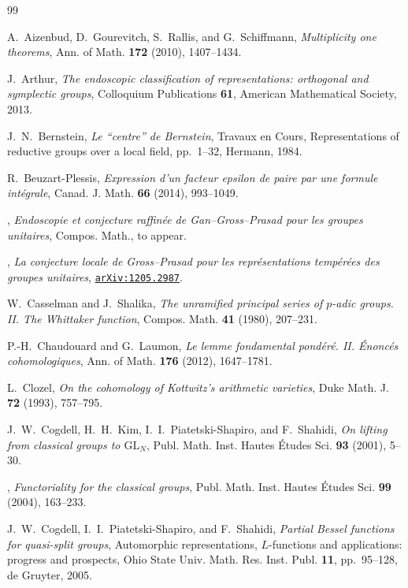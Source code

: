 \documentclass[11pt]{amsart}
\numberwithin{equation}{section}
\theoremstyle{plain}
\theoremstyle{definition}
\theoremstyle{remark}
\begin{document}
\begin{thebibliography}{99}

A.~Aizenbud, D.~Gourevitch, S.~Rallis, and G.~Schiffmann,
\emph{Multiplicity one theorems},
Ann. of Math. \textbf{172} (2010), 1407--1434.

J.~Arthur,
\emph{The endoscopic classification of representations: orthogonal and symplectic groups}, 
Colloquium Publications \textbf{61}, American Mathematical Society, 2013.

J.~N.~Bernstein,
\emph{Le ``centre'' de Bernstein},
Travaux en Cours, Representations of reductive groups over a local field, pp.~1--32, Hermann, 1984.

R.~Beuzart-Plessis,
\emph{Expression d'un facteur epsilon de paire par une formule int\'egrale},
Canad. J. Math. \textbf{66} (2014), 993--1049.

\bysame,
\emph{Endoscopie et conjecture raffin\'ee de Gan--Gross--Prasad pour les groupes unitaires}, 
Compos. Math., to appear.

\bysame,
\emph{La conjecture locale de Gross--Prasad pour les repr\'esentations temp\'er\'ees des groupes unitaires},
\href{http://arxiv.org/abs/1205.2987}{\texttt{arXiv:1205.2987}}.

W.~Casselman and J.~Shalika,
\emph{The unramified principal series of $p$-adic groups. II. The Whittaker function},
Compos. Math. \textbf{41} (1980), 207--231.

P.-H.~Chaudouard and G.~Laumon,
\emph{Le lemme fondamental pond{\'e}r{\'e}. II. {\'E}nonc{\'e}s cohomologiques},
Ann. of Math. \textbf{176} (2012), 1647--1781.

L.~Clozel,
\emph{On the cohomology of Kottwitz's arithmetic varieties},
Duke Math. J. \textbf{72} (1993), 757--795.

J.~W.~Cogdell, H.~H.~Kim, I.~I.~Piatetski-Shapiro, and F.~Shahidi,
\emph{On lifting from classical groups to $\mathrm{GL}_N$},
Publ. Math. Inst. Hautes \'Etudes Sci. \textbf{93} (2001), 5--30.

\bysame,
\emph{Functoriality for the classical groups},
Publ. Math. Inst. Hautes \'Etudes Sci. \textbf{99} (2004), 163--233.

J.~W.~Cogdell, I.~I.~Piatetski-Shapiro, and F.~Shahidi,
\emph{Partial Bessel functions for quasi-split groups},
Automorphic representations, $L$-functions and applications: progress and prospects,
Ohio State Univ. Math. Res. Inst. Publ. \textbf{11}, pp.~95--128, de Gruyter, 2005.


\end{thebibliography}
\end{document}
